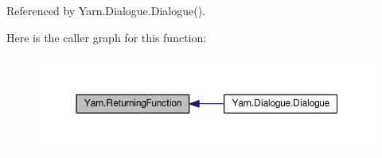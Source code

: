 Referenced by Yarn.\-Dialogue.\-Dialogue().



Here is the caller graph for this function\-:
\nopagebreak
\begin{figure}[H]
\begin{center}
\leavevmode
\includegraphics[width=350pt]{a00050_a5177bf74fbfe7303fac9d8236c2e514b_icgraph}
\end{center}
\end{figure}


